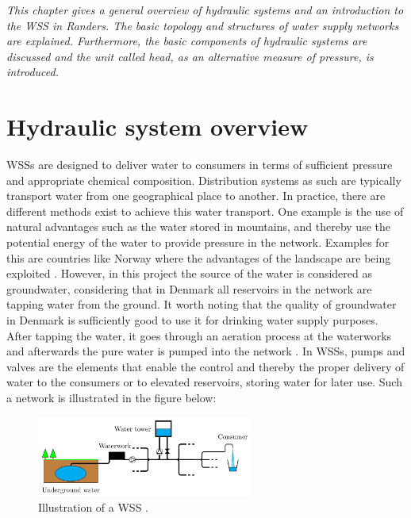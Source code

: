 \emph{This chapter gives a general overview of hydraulic systems and an introduction to the WSS in Randers. The basic topology and structures of water supply networks are explained. Furthermore, the basic components of hydraulic systems are discussed and the unit called head, as an alternative measure of pressure, is introduced.}

\section{Hydraulic system overview}
\label{hydraulic_system_overview}

WSSs are designed to deliver water to consumers in terms of sufficient pressure and appropriate chemical composition. Distribution systems as such are typically transport water from one geographical place to another. In practice, there are different methods exist to achieve this water transport. One example is the use of natural advantages such as the water stored in mountains, and thereby use the potential energy of the water to provide pressure in the network. Examples for this are countries like Norway where the advantages of the landscape are being exploited \cite{norway_mountains}. However, in this project the source of the water is considered as groundwater, considering that in Denmark all reservoirs in the network are tapping water from the ground. It worth noting that the quality of groundwater in Denmark is sufficiently good to use it for drinking water supply purposes. After tapping the water, it goes through an aeration process at the waterworks and afterwards the pure water is pumped into the network \cite{prahata}. In WSSs, pumps and valves are the elements that enable the control and thereby the proper delivery of water to the consumers or to elevated reservoirs, storing water for later use. Such a network is illustrated in the figure below: 

\begin{figure}[H]
\centering
\includegraphics[width=0.63\textwidth]{report/pictures/WSS_illustration}
\caption{Illustration of a WSS \cite{kenneth_houe}.}
\label{fig:WSS_example}
\end{figure}

